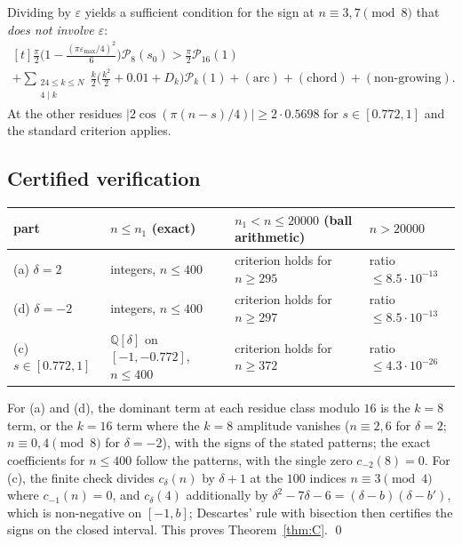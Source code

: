 \documentclass[11pt]{amsart}
\theoremstyle{remark}
\theoremstyle{definition}
\newcommand{\Q}{\mathbb Q}
\newcommand{\cP}{\mathcal P}
\begin{document}
Dividing by $\varepsilon$ yields a sufficient condition for the sign at $n\equiv3,7\pmod8$ that \emph{does not involve $\varepsilon$}:
\[
\begin{multlined}[t]\frac\pi2\Big(1-\frac{(\pi\varepsilon_{\max}/4)^2}6\Big)\cP_8(s_0)>\frac\pi2\cP_{16}(1)\\+\sum_{\substack{24\le k\le N\\4\mid k}}\frac k2\Big(\frac{k^2}2+0.01+D_k\Big)\cP_k(1)+(\text{arc})+(\text{chord})+(\text{non-growing}).\end{multlined}
\]
At the other residues $|2\cos(\pi(n-s)/4)|\ge2\cdot0.5698$ for $s\in[0.772,1]$ and the standard criterion applies.

\subsection{Certified verification}
\begin{center}
\begin{tabular}{p{2.2cm}p{3.6cm}p{4cm}p{2.6cm}}
\toprule
part & $n\le n_1$ (exact) & $n_1<n\le20000$ (ball arithmetic) & $n>20000$\\
\midrule
(a) $\delta=2$ & integers, $n\le400$ & criterion holds for $n\ge295$ & ratio $\le8.5\cdot10^{-13}$\\
(d) $\delta=-2$ & integers, $n\le400$ & criterion holds for $n\ge297$ & ratio $\le8.5\cdot10^{-13}$\\
(c) $s\in[0.772,1]$ & $\Q[\delta]$ on $[-1,-0.772]$, $n\le400$ & criterion holds for $n\ge372$ & ratio $\le4.3\cdot10^{-26}$\\
\bottomrule
\end{tabular}
\end{center}
For (a) and (d), the dominant term at each residue class modulo $16$ is the $k=8$ term, or the $k=16$ term where the $k=8$ amplitude vanishes ($n\equiv2,6$ for $\delta=2$; $n\equiv0,4\pmod8$ for $\delta=-2$), with the signs of the stated patterns; the exact coefficients for $n\le400$ follow the patterns, with the single zero $c_{-2}(8)=0$. For (c), the finite check divides $c_\delta(n)$ by $\delta+1$ at the $100$ indices $n\equiv3\pmod4$ where $c_{-1}(n)=0$, and $c_\delta(4)$ additionally by $\delta^2-7\delta-6=(\delta-b)(\delta-b')$, which is non-negative on $[-1,b]$; Descartes' rule with bisection then certifies the signs on the closed interval. This proves Theorem~\ref{thm:C}. \qed
\end{document}
